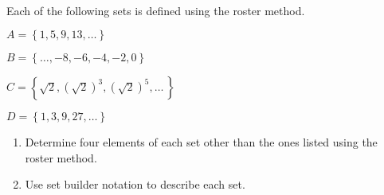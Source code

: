 \begin{prog}\label{pr:setbuilder} \hfill \\
Each of the following sets is defined using the roster method. 
\label{exer:setbuilder}%

\begin{multicols}{2}
$A = \left\{1, 5, 9, 13, \ldots \right\}$

$B = \left\{\ldots, -8, -6, -4, -2 , 0 \right\}$

$C = \left\{\sqrt{2}, \left( \sqrt{2}\right)^3, \left( \sqrt{2}\right)^5,  \ldots \,\right\}$

$D = \left\{1, 3, 9, 27, \ldots \right\}$
\end{multicols}

\begin{enumerate}
\item Determine four elements of each set other than the ones listed using the roster method.

\item Use set builder notation to describe each set.
\end{enumerate}
\end{prog}
\hbreak


\endinput

